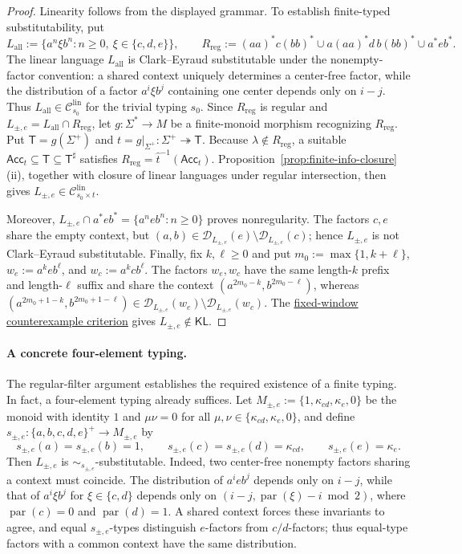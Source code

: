 \documentclass[11pt,a4paper]{article}
\theoremstyle{remark}
\theoremstyle{plain}
\newcommand{\D}{\mathcal{D}}
\newcommand{\lin}{\mathrm{lin}}
\newcommand{\Clin}[1]{\mathcal C_{#1}^{\lin}}
\begin{document}
\begin{proof}
Linearity follows from the displayed grammar. To establish finite-typed
substitutability, put
\[
 L_{\mathrm{all}}:=\{a^n\xi b^n:n\ge0,\ \xi\in\{c,d,e\}\},\qquad
 R_{\mathrm{reg}}:=(aa)^*c(bb)^*\cup a(aa)^*d\,b(bb)^*\cup a^*eb^*.
\]
The linear language $L_{\mathrm{all}}$ is Clark--Eyraud substitutable
under the nonempty-factor convention: a shared context uniquely determines
a center-free factor, while the distribution of a factor
$a^i\xi b^j$ containing one center depends only on $i-j$.
Thus $L_{\mathrm{all}}\in\Clin{s_0}$ for the trivial typing $s_0$.
Since $R_{\mathrm{reg}}$ is regular and $L_{\pm,e}=L_{\mathrm{all}}\cap R_{\mathrm{reg}}$,
let $g:\Sigma^*\to M$ be a finite-monoid morphism recognizing
$R_{\mathrm{reg}}$. Put $\mathsf T=g(\Sigma^+)$ and
$t=g|_{\Sigma^+}:\Sigma^+\twoheadrightarrow\mathsf T$.
Because $\lambda\notin R_{\mathrm{reg}}$, a suitable
$\mathsf{Acc}_t\subseteq\mathsf T\subseteq\mathsf T^\sharp$ satisfies
$R_{\mathrm{reg}}=\widehat t^{-1}(\mathsf{Acc}_t)$.
Proposition~\ref{prop:finite-info-closure}(ii), together with closure
of linear languages under regular intersection, then gives
$L_{\pm,e}\in\Clin{s_0\times t}$.

Moreover, $L_{\pm,e}\cap a^*eb^*=\{a^neb^n:n\ge0\}$ proves nonregularity.
The factors $c,e$ share the empty context, but
$(a,b)\in\D_{L_{\pm,e}}(e)\setminus\D_{L_{\pm,e}}(c)$;
hence $L_{\pm,e}$ is not Clark--Eyraud substitutable.
Finally, fix $k,\ell\ge0$ and put
$m_0:=\max\{1,k+\ell\}$,
$w_e:=a^keb^\ell$, and $w_c:=a^kcb^\ell$.
The factors $w_e,w_c$ have the same length-$k$ prefix and
length-$\ell$ suffix and share the context
$(a^{2m_0-k},b^{2m_0-\ell})$, whereas
$(a^{2m_0+1-k},b^{2m_0+1-\ell})
\in\D_{L_{\pm,e}}(w_e)\setminus\D_{L_{\pm,e}}(w_c)$.
The \hyperref[crit:kl]{fixed-window counterexample criterion} gives
$L_{\pm,e}\notin\mathsf{KL}$.
\end{proof}

\paragraph{A concrete four-element typing.}
The regular-filter argument establishes the required existence of a
finite typing. In fact, a four-element typing already suffices.
Let $M_{\pm,e}:=\{1,\kappa_{cd},\kappa_e,0\}$ be the monoid with identity
$1$ and $\mu\nu=0$ for all
$\mu,\nu\in\{\kappa_{cd},\kappa_e,0\}$, and define
$s_{\pm,e}:\{a,b,c,d,e\}^+\to M_{\pm,e}$ by
\begin{equation}\label{eq:lpm-s}
 s_{\pm,e}(a)=s_{\pm,e}(b)=1,\qquad
 s_{\pm,e}(c)=s_{\pm,e}(d)=\kappa_{cd},\qquad
 s_{\pm,e}(e)=\kappa_e.
\end{equation}
Then $L_{\pm,e}$ is $\sim_{s_{\pm,e}}$-substitutable.
Indeed, two center-free nonempty factors sharing a context
must coincide. The distribution of $a^ieb^j$ depends only on $i-j$,
while that of $a^i\xi b^j$ for $\xi\in\{c,d\}$ depends only on
$(i-j,\operatorname{par}(\xi)-i\bmod2)$, where
$\operatorname{par}(c)=0$ and $\operatorname{par}(d)=1$.
A shared context forces these invariants to agree, and equal
$s_{\pm,e}$-types distinguish $e$-factors from $c/d$-factors;
thus equal-type factors with a common context have the same distribution.
\end{document}
